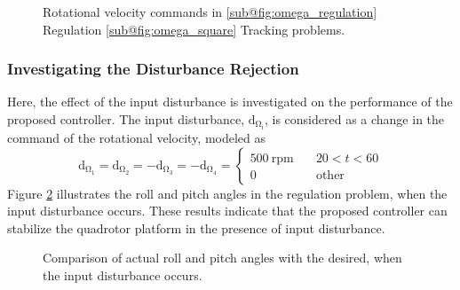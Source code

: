 \documentclass[3p]{elsarticle}
\begin{document}
\begin{figure}[H]
	\caption{Rotational velocity  commands in \ref{sub@fig:omega_regulation} Regulation \ref{sub@fig:omega_square} Tracking problems.}
	\label{fig:omega}
\end{figure}
\subsubsection{Investigating the Disturbance Rejection}\label{sec:disturbance}
\noindent Here, the effect of the input disturbance is investigated on the performance of the proposed controller.
The input disturbance, $\mathrm{d_{\Omega_i}}$, is considered as a change in the command of the rotational velocity, modeled as %
\begin{equation}
	\mathrm{d_{\Omega_1}} = \mathrm{d_{\Omega_2}} = -\mathrm{d_{\Omega_3}} = -\mathrm{d_{\Omega_4}} = \begin{cases}
		500~{\mathrm{rpm}} \quad &20<t<60\\
		0 \quad &\mathrm{other}
	\end{cases}
\end{equation}
Figure \ref{fig:disturbance} illustrates the roll and pitch angles in the regulation problem, when the input disturbance occurs. These results indicate that the proposed controller can stabilize the quadrotor platform in the presence of input disturbance.



\begin{figure}[H]
	\centering
	
	\caption{Comparison of actual roll and pitch angles with the desired, when the input disturbance occurs.}
	\label{fig:disturbance}
\end{figure}
\end{document}

